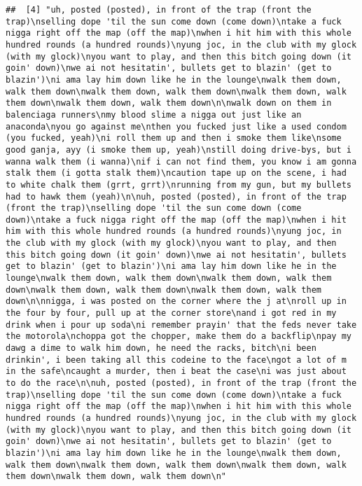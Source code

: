 \documentclass[]{article}
\begin{document}
\begin{verbatim}
##  [4] "uh, posted (posted), in front of the trap (front the trap)\nselling dope 'til the sun come down (come down)\ntake a fuck nigga right off the map (off the map)\nwhen i hit him with this whole hundred rounds (a hundred rounds)\nyung joc, in the club with my glock (with my glock)\nyou want to play, and then this bitch going down (it goin' down)\nwe ai not hesitatin', bullets get to blazin' (get to blazin')\ni ama lay him down like he in the lounge\nwalk them down, walk them down\nwalk them down, walk them down\nwalk them down, walk them down\nwalk them down, walk them down\n\nwalk down on them in balenciaga runners\nmy blood slime a nigga out just like an anaconda\nyou go against me\nthen you fucked just like a used condom (you fucked, yeah)\ni roll them up and then i smoke them like\nsome good ganja, ayy (i smoke them up, yeah)\nstill doing drive-bys, but i wanna walk them (i wanna)\nif i can not find them, you know i am gonna stalk them (i gotta stalk them)\ncaution tape up on the scene, i had to white chalk them (grrt, grrt)\nrunning from my gun, but my bullets had to hawk them (yeah)\n\nuh, posted (posted), in front of the trap (front the trap)\nselling dope 'til the sun come down (come down)\ntake a fuck nigga right off the map (off the map)\nwhen i hit him with this whole hundred rounds (a hundred rounds)\nyung joc, in the club with my glock (with my glock)\nyou want to play, and then this bitch going down (it goin' down)\nwe ai not hesitatin', bullets get to blazin' (get to blazin')\ni ama lay him down like he in the lounge\nwalk them down, walk them down\nwalk them down, walk them down\nwalk them down, walk them down\nwalk them down, walk them down\n\nnigga, i was posted on the corner where the j at\nroll up in the four by four, pull up at the corner store\nand i got red in my drink when i pour up soda\ni remember prayin' that the feds never take the motorola\nchoppa got the chopper, make them do a backflip\npay my dawg a dime to walk him down, he need the racks, bitch\ni been drinkin', i been taking all this codeine to the face\ngot a lot of m in the safe\ncaught a murder, then i beat the case\ni was just about to do the race\n\nuh, posted (posted), in front of the trap (front the trap)\nselling dope 'til the sun come down (come down)\ntake a fuck nigga right off the map (off the map)\nwhen i hit him with this whole hundred rounds (a hundred rounds)\nyung joc, in the club with my glock (with my glock)\nyou want to play, and then this bitch going down (it goin' down)\nwe ai not hesitatin', bullets get to blazin' (get to blazin')\ni ama lay him down like he in the lounge\nwalk them down, walk them down\nwalk them down, walk them down\nwalk them down, walk them down\nwalk them down, walk them down\n"                                                                                                                                                                                                                                                                                                                                                                                                                                                                                                                                                                              
\end{verbatim}
\end{document}
